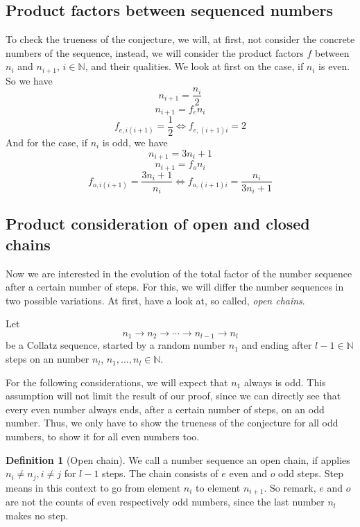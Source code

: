 \documentclass{aomart}
\theoremstyle{definition}
\newtheorem{defn}{Definition}[section]
\begin{document}
\subsection{Product factors between sequenced numbers}
\label{ss:prodfact}
To check the trueness of the conjecture, we will, at first, not consider the concrete numbers of the sequence, instead, we will consider the product factors $f$ between $n_{i}$ and $n_{i+1}$, $i \in \mathbb{N}$, and their qualities.
We look at first on the case, if $n_{i}$ is even. So we have
\[ n_{i+1} = \frac{n_{i}}{2} \]
\[ n_{i+1} = f_{e} n_{i} \]
\begin{equation}\label{eq:faceven}
	f_{e,i(i+1)} = \frac{1}{2} \Leftrightarrow f_{e,(i+1)i} = 2
\end{equation}
And for the case, if $n_{i}$ is odd, we have
\[ n_{i+1} = 3n_{i} + 1 \]
\[ n_{i+1} = f_{o} n_{i} \]
\begin{equation}\label{eq:facodd}
	f_{o,i(i+1)} = \frac{3n_{i}+1}{n_{i}} \Leftrightarrow f_{o,(i+1)i} = \frac{n_{i}}{3n_{i}+1}
\end{equation}
\subsection{Product consideration of open and closed chains}
\label{ss:clch}
Now we are interested in the evolution of the total factor of the number sequence after a certain number of steps. For this, we will differ the number sequences in two possible variations. At first, have a look at, so called, \textit{open chains}.

Let
\[ n_{1} \rightarrow n_{2} \rightarrow \cdots \rightarrow n_{l-1} \rightarrow n_{l} \]
be a Collatz sequence, started by a random number $n_{1}$ and ending after $l-1 \in \mathbb{N}$ steps on an number $n_{l}$, $n_{1},... ,n_{l} \in \mathbb{N}$. 

For the following considerations, we will expect that $n_{1}$ always is odd. This assumption will not limit the result of our proof, since we can directly see that every even number always ends, after a certain number of steps, on an odd number. Thus, we only have to show the trueness of the conjecture for all odd numbers, to show it for all even numbers too. 

\begin{defn}[Open chain] We call a number sequence an open chain, if applies $n_{i} \neq n_{j}, i \neq j$ for $l-1$ steps. The chain consists of $e$ even and $o$ odd steps. Step means in this context to go from element $n_{i}$ to element $n_{i+1}$. So remark, $e$ and $o$ are not the counts of even respectively odd numbers, since the last number $n_{l}$ makes no step.  
\end{defn}
\end{document}
